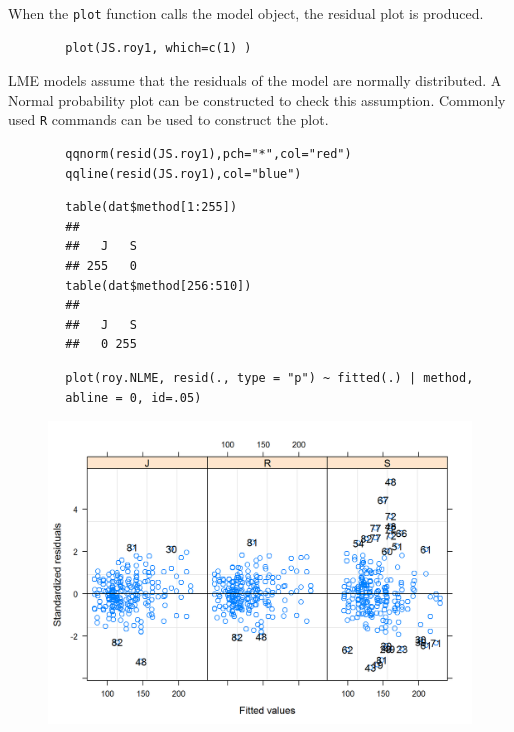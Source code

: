 \documentclass[12pt, a4paper]{report}
\theoremstyle{plain}
\theoremstyle{definition}
\theoremstyle{remark}
\begin{document}
	When the \texttt{plot} function calls the model object, the residual plot is produced.
	
	
	
	
	\begin{framed}
		\begin{verbatim}
		plot(JS.roy1, which=c(1) )
		\end{verbatim}
	\end{framed}
	
	LME models assume that the residuals of the model are normally distributed. A Normal probability plot can be constructed to check this assumption. Commonly used \texttt{R} commands can be used to construct the plot.
	
	
	\begin{framed}
		\begin{verbatim}
		qqnorm(resid(JS.roy1),pch="*",col="red")
		qqline(resid(JS.roy1),col="blue")
		\end{verbatim}
	\end{framed}
	
	\begin{framed}
		\begin{verbatim}
		table(dat$method[1:255])
		## 
		##   J   S 
		## 255   0
		table(dat$method[256:510])
		## 
		##   J   S 
		##   0 255
		\end{verbatim}	
	\end{framed}
	\newpage
	\begin{framed}
		\begin{verbatim}
		plot(roy.NLME, resid(., type = "p") ~ fitted(.) | method, 
		abline = 0, id=.05)
		\end{verbatim}
	\end{framed}
	\begin{figure}
		\centering
		\includegraphics[width=0.9\linewidth]{images/bloodnlmeResidPlot2}
		\caption{}
		\label{fig:blood}
	\end{figure}
	
\end{document}

